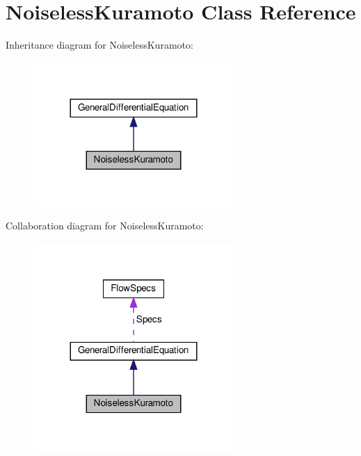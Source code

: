 \hypertarget{classNoiselessKuramoto}{}\section{Noiseless\+Kuramoto Class Reference}
\label{classNoiselessKuramoto}


Inheritance diagram for Noiseless\+Kuramoto\+:
\nopagebreak
\begin{figure}[H]
\begin{center}
\leavevmode
\includegraphics[width=216pt]{classNoiselessKuramoto__inherit__graph}
\end{center}
\end{figure}


Collaboration diagram for Noiseless\+Kuramoto\+:
\nopagebreak
\begin{figure}[H]
\begin{center}
\leavevmode
\includegraphics[width=216pt]{classNoiselessKuramoto__coll__graph}
\end{center}
\end{figure}
